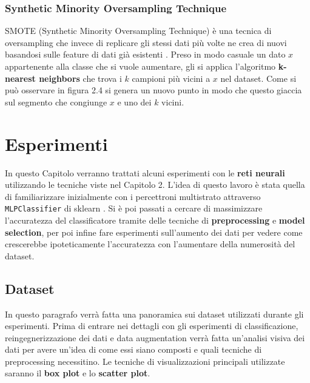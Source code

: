\documentclass[12pt, twoside, letterpaper]{report}
\begin{document}
			\subsection{Synthetic Minority Oversampling Technique} \label{sec:smote}
				SMOTE (Synthetic Minority Oversampling Technique) è una tecnica di oversampling che invece di replicare gli stessi dati più volte ne crea di nuovi basandosi sulle feature di dati già esistenti \cite{smote}. Preso in modo casuale un dato $x$ appartenente alla classe che si vuole aumentare, gli si applica l'algoritmo \textbf{k-nearest neighbors} che trova i $k$ campioni più vicini a $x$ nel dataset. Come si può osservare in figura 2.4 si genera un nuovo punto in modo che questo giaccia sul segmento che congiunge $x$ e uno dei $k$ vicini. %


				
				
	\chapter{Esperimenti} \label{chap:esperimenti}
		In questo Capitolo verranno trattati alcuni esperimenti con le \textbf{reti neurali} utilizzando le tecniche viste nel Capitolo 2. L'idea di questo lavoro è stata quella di familiarizzare inizialmente con i percettroni multistrato attraverso \texttt{MLPClassifier} di sklearn \cite{sklearn}. Si è poi passati a cercare di massimizzare l'accuratezza del classificatore tramite delle tecniche di \textbf{preprocessing} e \textbf{model selection}, per poi infine fare esperimenti sull'aumento dei dati per vedere come crescerebbe ipoteticamente l'accuratezza con l'aumentare della numerosità del dataset.
	
	\section{Dataset} 
		In questo paragrafo verrà fatta una panoramica sui dataset utilizzati durante gli esperimenti. Prima di entrare nei dettagli con gli esperimenti di classificazione, reingegnerizzazione dei dati e data augmentation verrà fatta un'analisi visiva dei dati per avere un'idea di come essi siano composti e quali tecniche di preprocessing necessitino.  Le tecniche di visualizzazioni principali utilizzate saranno il \textbf{box plot} e lo \textbf{scatter plot}. 
		\begin{table}[h]
			\noindent{}
			\caption{\label{tab:iris}Tre misurazioni appartenenti all'iris dataset.}
		\end{table}
			
\end{document}
